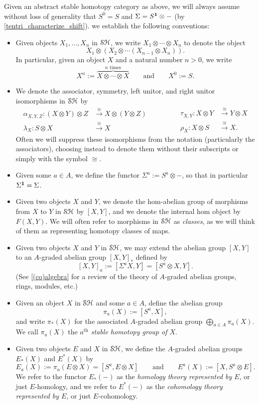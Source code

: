 \documentclass[../main.tex]{subfiles}
\begin{document}
Given an abstract stable homotopy category as above, we will always assume without loss of generality that $S^0=S$ and $\Sigma=S^{\mathbf{1}}\otimes-$ (by \autoref{tentri_characterize_shift}). we establish the following conventions:
\begin{itemize}
	\item Given objects $X_1,\ldots,X_n$ in $\mathcal{SH}$, we write $X_1\otimes\cdots\otimes X_n$ to denote the object
	\[X_1\otimes(X_2\otimes\cdots(X_{n-1}\otimes X_n)).\]
	In particular, given an object $X$ and a natural number $n>0$, we write
	\[X^n:=\overbrace{X\otimes\cdots\otimes X}^\text{$n$ times}\qquad\text{and}\qquad X^0:=S.\]
	\item We denote the associator, symmetry, left unitor, and right unitor isomorphisms in $\mathcal{SH}$ by
	\[\begin{split}
		\alpha_{X,Y,Z}:(X\otimes Y)\otimes Z&\xrightarrow\cong X\otimes(Y\otimes Z) \\
		\lambda_X:S\otimes  X&\xrightarrow\cong X 
	\end{split}\qquad\qquad\begin{split}
		\tau_{X,Y}:X\otimes Y &\xrightarrow\cong Y\otimes X\\
		\rho_X:X\otimes S&\xrightarrow\cong X.
	\end{split}\]
	Often we will suppress these isomorphisms from the notation (particularly the associators), choosing instead to denote them without their subscripts or simply with the symbol $\cong$.
	\item Given some $a\in A$, we define the functor $\Sigma^a:=S^a\otimes-$, so that in particular $\Sigma^{\mathbf{1}}=\Sigma$.
	\item Given two objects $X$ and $Y$, we denote the hom-abelian group of morphisms from $X$ to $Y$ in $\mathcal{SH}$ by $[X,Y]$, and we denote the internal hom object by $F(X,Y)$. We will often refer to morphisms in $\mathcal{SH}$ as \textit{classes}, as we will think of them as representing homotopy classes of maps.
	\item Given two objects $X$ and $Y$ in $\mathcal{SH}$, we may extend the abelian group $[X,Y]$ to an $A$-graded abelian group $[X,Y]_*$ defined by
	\[[X,Y]_a:=[\Sigma^aX,Y]=[S^a\otimes X,Y].\]
	(See \autoref{(co)algebra} for a review of the theory of $A$-graded abelian groups, rings, modules, etc.)
	\item Given an object $X$ in $\mathcal{SH}$ and some $a\in A$, define the abelian group 
	\[\pi_a(X):=[S^a,X],\]
	and write $\pi_*(X)$ for the associated $A$-graded abelian group $\bigoplus_{a\in A}\pi_a(X)$. We call $\pi_a(X)$ the \emph{$a^\text{th}$ stable homotopy group of $X$}.
	\item Given two objects $E$ and $X$ in $\mathcal{SH}$, we define the $A$-graded abelian groups $E_*(X)$ and $E^*(X)$ by
	\[E_a(X):=\pi_a(E\otimes X)=[S^a,E\otimes X]\qquad\text{and}\qquad E^a(X):=[X,S^a\otimes E].\]
	We refer to the functor $E_*(-)$ as the \emph{homology theory represented by $E$}, or just $E$-homology, and we refer to $E^*(-)$ as the \emph{cohomology theory represented by $E$}, or just $E$-cohomology.
\end{itemize}
\end{document}
